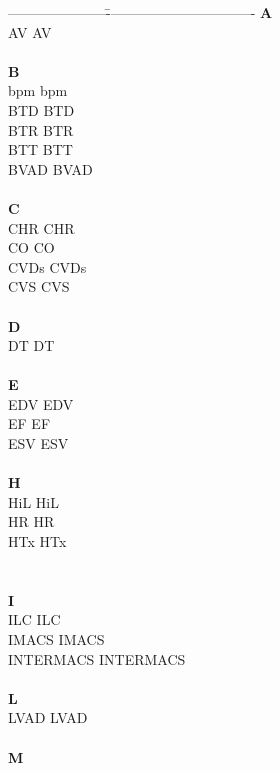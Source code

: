 \begin{tabbing}
  ---------------------\=--------------------------------\kill
  \textbf{A}\\
\acs{AV}       \> \acl{AV} \\
\\
\textbf{B}\\
\acs{bpm}       \> \acl{bpm} \\
\acs{BTD}       \> \acl{BTD} \\
\acs{BTR}       \> \acl{BTR} \\
\acs{BTT}       \> \acl{BTT} \\
\acs{BVAD}       \> \acl{BVAD} \\
\\
\textbf{C}\\
\acs{CHR}       \> \acl{CHR} \\
\acs{CO}       \> \acl{CO} \\
\acs{CVDs}       \> \acl{CVDs} \\
\acs{CVS}       \> \acl{CVS} \\
\\
\textbf{D}\\
\acs{DT}       \> \acl{DT} \\
\\
\textbf{E}\\
\acs{EDV}       \> \acl{EDV} \\
\acs{EF}       \> \acl{EF} \\
\acs{ESV}       \> \acl{ESV} \\
\\
\textbf{H}\\
\acs{HiL}       \> \acl{HiL} \\
\acs{HR}       \> \acl{HR} \\
\acs{HTx}       \> \acl{HTx} \\
\\
\\
\pagebreak
\textbf{I}\\
\acs{ILC}       \> \acl{ILC} \\
\acs{IMACS}       \> \acl{IMACS}\\
\acs{INTERMACS}       \> \acl{INTERMACS}\\
\\
\textbf{L}\\
\acs{LVAD}       \> \acl{LVAD} \\
\\
\textbf{M}\\

\end{tabbing}
